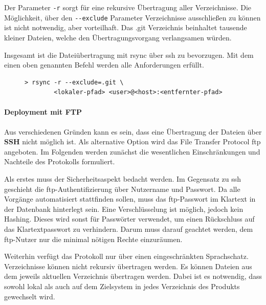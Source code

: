 Der Parameter \lstinline!-r! sorgt für eine rekursive Übertragung aller Verzeichnisse. Die Möglichkeit, über den \lstinline!--exclude! Parameter Verzeichnisse ausschließen zu können ist nicht notwendig, aber vorteilhaft. Das .git Verzeichnis beinhaltet tausende kleiner Dateien, welche den Übertragungsvorgang verlangsamen würden.

Insgesamt ist die Dateiübertragung mit rsync über \gls{ssh} zu bevorzugen. Mit dem einen oben genannten Befehl werden alle Anforderungen erfüllt.

\begin{figure}
	\begin{lstlisting}[caption=Beispiel rsync Befehl,label={lst:example_rsync}]
	> rsync -r --exclude=.git \
		<lokaler-pfad> <user>@<host>:<entfernter-pfad>
	\end{lstlisting}
\end{figure}


\paragraph{Deployment mit FTP} %
\label{par:deployment_mit_ftp}

Aus verschiedenen Gründen kann es sein, dass eine Übertragung der Dateien über \textbf{SSH} nicht möglich ist. Als alternative Option wird das File Transfer Protocol \gls{ftp} angeboten. Im Folgenden werden zunächst die wesentlichen Einschränkungen und Nachteile des Protokolls formuliert.

Als erstes muss der Sicherheitsaspekt bedacht werden. Im Gegensatz zu \gls{ssh} geschieht die \gls{ftp}-Authentifizierung über Nutzername und Passwort. Da alle Vorgänge automatisiert stattfinden sollen, muss das \gls{ftp}-Passwort im Klartext in der Datenbank hinterlegt sein. Eine Verschlüsselung ist möglich, jedoch kein Hashing. Dieses wird sonst für Passwörter verwendet, um einen Rückschluss auf das Klartextpasswort zu verhindern. Darum muss darauf geachtet werden, dem \gls{ftp}-Nutzer nur die minimal nötigen Rechte einzuräumen.

Weiterhin verfügt das Protokoll nur über einen eingeschränkten Sprachschatz. Verzeichnisse können nicht rekursiv übertragen werden. Es können Dateien aus dem jeweils aktuellen Verzeichnis übertragen werden. Dabei ist es notwendig, dass sowohl lokal als auch auf dem Zielsystem in jedes Verzeichnis des Produkts gewechselt wird.


